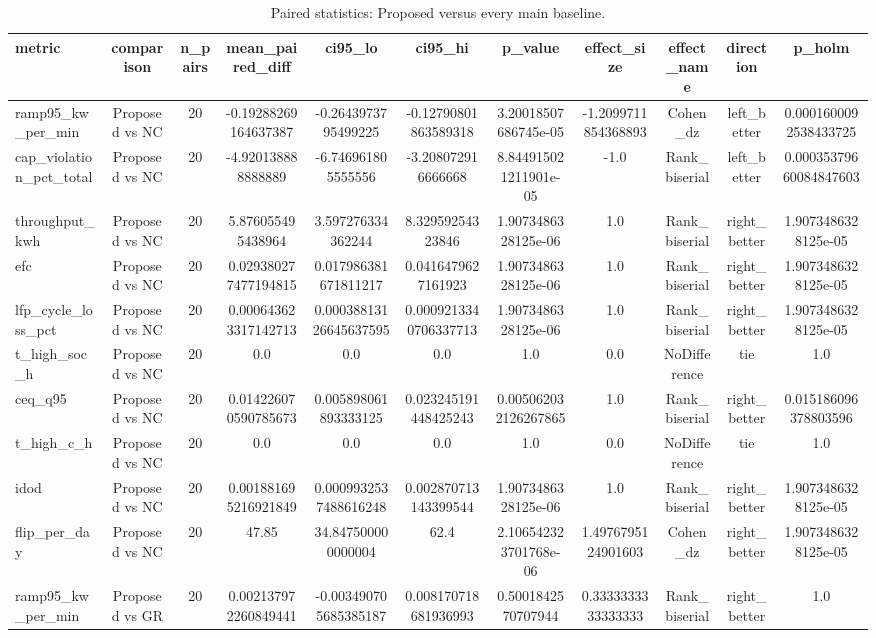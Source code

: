 \begin{table}[t]
\centering
\caption{Paired statistics: Proposed versus every main baseline.}
\label{tab:stats_all_auto}
\begin{tabular}{lcccccccccc}
\toprule
metric & comparison & n\_pairs & mean\_paired\_diff & ci95\_lo & ci95\_hi & p\_value & effect\_size & effect\_name & direction & p\_holm \\
\midrule
ramp95\_kw\_per\_min & Proposed vs NC & 20 & -0.19288269164637387 & -0.2643973795499225 & -0.12790801863589318 & 3.20018507686745e-05 & -1.2099711854368893 & Cohen\_dz & left\_better & 0.0001600092538433725 \\
cap\_violation\_pct\_total & Proposed vs NC & 20 & -4.920138888888889 & -6.746961805555556 & -3.208072916666668 & 8.844915021211901e-05 & -1.0 & Rank\_biserial & left\_better & 0.00035379660084847603 \\
throughput\_kwh & Proposed vs NC & 20 & 5.876055495438964 & 3.597276334362244 & 8.32959254323846 & 1.9073486328125e-06 & 1.0 & Rank\_biserial & right\_better & 1.9073486328125e-05 \\
efc & Proposed vs NC & 20 & 0.029380277477194815 & 0.017986381671811217 & 0.0416479627161923 & 1.9073486328125e-06 & 1.0 & Rank\_biserial & right\_better & 1.9073486328125e-05 \\
lfp\_cycle\_loss\_pct & Proposed vs NC & 20 & 0.000643623317142713 & 0.00038813126645637595 & 0.0009213340706337713 & 1.9073486328125e-06 & 1.0 & Rank\_biserial & right\_better & 1.9073486328125e-05 \\
t\_high\_soc\_h & Proposed vs NC & 20 & 0.0 & 0.0 & 0.0 & 1.0 & 0.0 & NoDifference & tie & 1.0 \\
ceq\_q95 & Proposed vs NC & 20 & 0.014226070590785673 & 0.005898061893333125 & 0.023245191448425243 & 0.005062032126267865 & 1.0 & Rank\_biserial & right\_better & 0.015186096378803596 \\
t\_high\_c\_h & Proposed vs NC & 20 & 0.0 & 0.0 & 0.0 & 1.0 & 0.0 & NoDifference & tie & 1.0 \\
idod & Proposed vs NC & 20 & 0.001881695216921849 & 0.0009932537488616248 & 0.002870713143399544 & 1.9073486328125e-06 & 1.0 & Rank\_biserial & right\_better & 1.9073486328125e-05 \\
flip\_per\_day & Proposed vs NC & 20 & 47.85 & 34.847500000000004 & 62.4 & 2.106542323701768e-06 & 1.4976795124901603 & Cohen\_dz & right\_better & 1.9073486328125e-05 \\
ramp95\_kw\_per\_min & Proposed vs GR & 20 & 0.002137972260849441 & -0.003490705685385187 & 0.008170718681936993 & 0.5001842570707944 & 0.3333333333333333 & Rank\_biserial & right\_better & 1.0 \\

\end{tabular}
\end{table}
